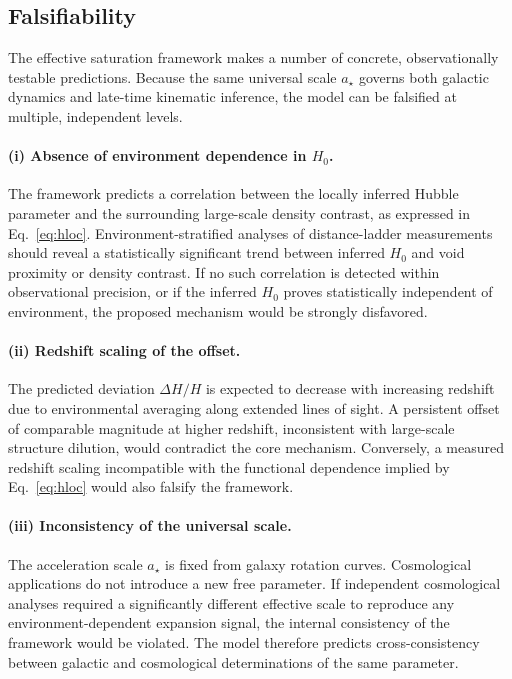 \subsection{Falsifiability}
  \label{subsec:falsifiability}

  The effective saturation framework makes a number of concrete,
  observationally testable predictions.
  Because the same universal scale $a_\star$ governs both
  galactic dynamics and late-time kinematic inference,
  the model can be falsified at multiple, independent levels.

  \paragraph{(i) Absence of environment dependence in $H_0$.}

    The framework predicts a correlation between the locally inferred
    Hubble parameter and the surrounding large-scale density contrast,
    as expressed in Eq.~\eqref{eq:hloc}.
    Environment-stratified analyses of distance-ladder measurements
    should reveal a statistically significant trend between inferred $H_0$
    and void proximity or density contrast.
    If no such correlation is detected within observational precision,
    or if the inferred $H_0$ proves statistically independent of environment,
    the proposed mechanism would be strongly disfavored.

  \paragraph{(ii) Redshift scaling of the offset.}

    The predicted deviation $\Delta H/H$ is expected to decrease
    with increasing redshift due to environmental averaging
    along extended lines of sight.
    A persistent offset of comparable magnitude at higher redshift,
    inconsistent with large-scale structure dilution,
    would contradict the core mechanism.
    Conversely, a measured redshift scaling incompatible with
    the functional dependence implied by Eq.~\eqref{eq:hloc}
    would also falsify the framework.

  \paragraph{(iii) Inconsistency of the universal scale.}

    The acceleration scale $a_\star$ is fixed from galaxy rotation curves.
    Cosmological applications do not introduce a new free parameter.
    If independent cosmological analyses required a significantly
    different effective scale to reproduce any environment-dependent
    expansion signal, the internal consistency of the framework
    would be violated.
    The model therefore predicts cross-consistency between galactic
    and cosmological determinations of the same parameter.

